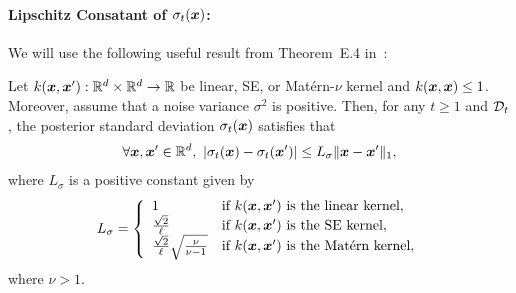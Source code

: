 \paragraph{Lipschitz Consatant of $\sigma_t(\boldsymbol{x})$:}
We will use the following useful result from Theorem~E.4 in~\citet{Kusakawa2022-bayesian}:
\begin{lemma}
    Let $k(\boldsymbol{x}, \boldsymbol{x}^\prime): \mathbb{R}^d \times \mathbb{R}^d \to \mathbb{R}$ be linear, SE, or Mat\'{e}rn-$\nu$ kernel and $k(\boldsymbol{x}, \boldsymbol{x}) \leq 1$. 
    Moreover, assume that a noise variance $\sigma^2$ is positive.
    Then, for any $t \geq 1$ and ${\cal D}_{t}$, the posterior standard deviation $\sigma_{t} (\boldsymbol{x} )$ satisfies that 
    \begin{align*}
        \forall \boldsymbol{x},\boldsymbol{x}^\prime \in \mathbb{R}^d, \ | \sigma_{t} (\boldsymbol{x} ) - \sigma_{t} (\boldsymbol{x}^\prime ) | \leq L_{\sigma} \| \boldsymbol{x} - \boldsymbol{x}^\prime \| _1,
    \end{align*}
    where $L_{\sigma}$ is a positive constant given by 
    \begin{align*}
        L_{\sigma} = \left\{
        \begin{array}{ll}
            1 & \text{if $k(\boldsymbol{x},\boldsymbol{x}^\prime)$ is the linear kernel}, \\
            \frac{\sqrt{2}}{\ell} & \text{if $k(\boldsymbol{x},\boldsymbol{x}^\prime)$ is the SE kernel}, \\
            \frac{\sqrt{2}}{\ell}
            \sqrt{\frac{\nu}{\nu-1} } & \text{if $k(\boldsymbol{x},\boldsymbol{x}^\prime)$ is the Mat\'{e}rn kernel},
        \end{array}\right.
    \end{align*}
    where $\nu > 1$.
    \label{lem:Lipschitz_posterior_var}
\end{lemma}

